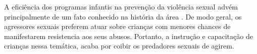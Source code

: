 
A eficiência dos programas infantis na prevenção da violência sexual advém principalmente de um fato conhecido na história da área \cite{budin1989sex}. De modo geral, os agressores sexuais preferem atuar sobre crianças com menores chances de manifestarem resistencia aos seus abusos. Portanto, a instrução e capacitação de crianças nessa temática, acaba por coibir os predadores sexuais de agirem. %












